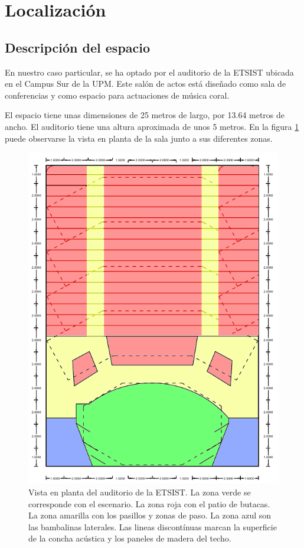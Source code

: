 \documentclass[11pt,a4paper]{book}
\begin{document}
	\section{Localización}

		\subsection{Descripción del espacio}

 			En nuestro caso particular, se ha optado por el auditorio de la ETSIST ubicada en el Campus Sur de la UPM. Este salón de actos está diseñado como sala de conferencias y como espacio para actuaciones de música coral. 
 
 			El espacio tiene unas dimensiones de 25 metros de largo, por 13.64 metros de ancho. El auditorio tiene una altura aproximada de unos 5 metros. En la figura \ref{fig:auditorio} puede observarse la vista en planta de la sala junto a sus diferentes zonas.
 			
 			\begin{figure}
				\includegraphics[scale=0.6]{../imagenes/auditorioColor.png}
				\centering
				\caption{Vista en planta del auditorio de la ETSIST. La zona verde se corresponde con el escenario. La zona roja con el patio de butacas. La zona amarilla con los pasillos y zonas de paso. La zona azul son las bambalinas laterales. Las lineas discontínuas marcan la superficie de la concha acústica y los paneles de madera del techo.}
				\label{fig:auditorio}
			\end{figure}
 
\end{document}
